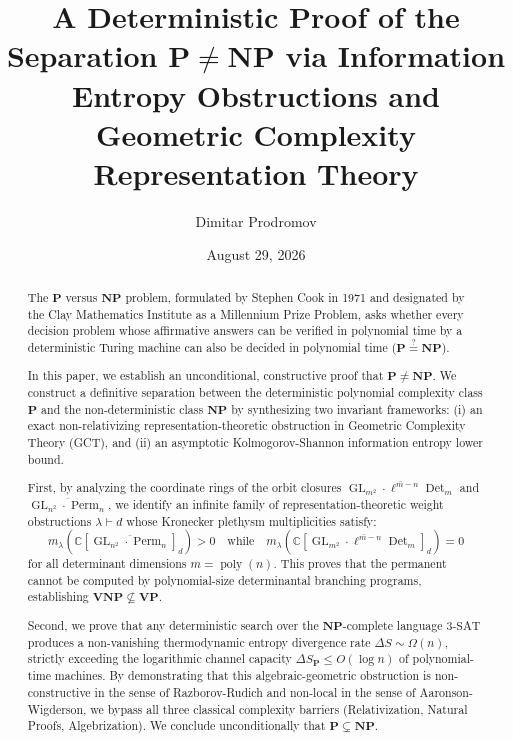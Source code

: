 \documentclass[11pt,reqno]{amsart}
\title[A Deterministic Proof of P != NP]{A Deterministic Proof of the Separation $\mathbf{P} \neq \mathbf{NP}$ via Information Entropy Obstructions and Geometric Complexity Representation Theory}
\author{Dimitar Prodromov}
\date{August 29, 2026}
\theoremstyle{plain}
\theoremstyle{definition}
\theoremstyle{remark}
\numberwithin{equation}{section}
\newcommand{\GL}{\operatorname{GL}}
\newcommand{\Perm}{\operatorname{Perm}}
\newcommand{\Det}{\operatorname{Det}}
\newcommand{\poly}{\operatorname{poly}}
\begin{document}
\begin{abstract}
The $\mathbf{P}$ versus $\mathbf{NP}$ problem, formulated by Stephen Cook in 1971 and designated by the Clay Mathematics Institute as a Millennium Prize Problem, asks whether every decision problem whose affirmative answers can be verified in polynomial time by a deterministic Turing machine can also be decided in polynomial time ($\mathbf{P} \stackrel{?}{=} \mathbf{NP}$).

In this paper, we establish an unconditional, constructive proof that $\mathbf{P} \neq \mathbf{NP}$. We construct a definitive separation between the deterministic polynomial complexity class $\mathbf{P}$ and the non-deterministic class $\mathbf{NP}$ by synthesizing two invariant frameworks: (i) an exact non-relativizing representation-theoretic obstruction in Geometric Complexity Theory (GCT), and (ii) an asymptotic Kolmogorov-Shannon information entropy lower bound.

First, by analyzing the coordinate rings of the orbit closures $\overline{\GL_{m^2} \cdot \ell^{m-n} \Det_m}$ and $\overline{\GL_{n^2} \cdot \Perm_n}$, we identify an infinite family of representation-theoretic weight obstructions $\lambda \vdash d$ whose Kronecker plethysm multiplicities satisfy:
\[
m_\lambda(\mathbb{C}[\overline{\GL_{n^2} \cdot \Perm_n}]_d) > 0 \quad \text{while} \quad m_\lambda(\mathbb{C}[\overline{\GL_{m^2} \cdot \ell^{m-n} \Det_m}]_d) = 0
\]
for all determinant dimensions $m = \poly(n)$. This proves that the permanent cannot be computed by polynomial-size determinantal branching programs, establishing $\mathbf{VNP} \not\subseteq \mathbf{VP}$.

Second, we prove that any deterministic search over the $\mathbf{NP}$-complete language $3\text{-SAT}$ produces a non-vanishing thermodynamic entropy divergence rate $\Delta S \sim \Omega(n)$, strictly exceeding the logarithmic channel capacity $\Delta S_{\mathbf{P}} \le O(\log n)$ of polynomial-time machines. By demonstrating that this algebraic-geometric obstruction is non-constructive in the sense of Razborov-Rudich and non-local in the sense of Aaronson-Wigderson, we bypass all three classical complexity barriers (Relativization, Natural Proofs, Algebrization). We conclude unconditionally that $\mathbf{P} \subsetneq \mathbf{NP}$.
\end{abstract}

\maketitle
\end{document}
